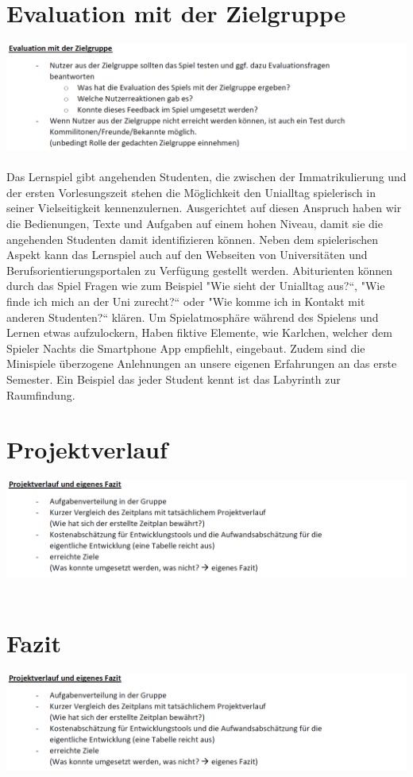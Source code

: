 \documentclass[a4paper, 11pt]{article} %
\begin{document}
\section{Evaluation mit der Zielgruppe}
\includegraphics[scale=0.5]{images/evaluation.png}\\\\
Das Lernspiel gibt angehenden Studenten, die zwischen der Immatrikulierung und der ersten Vorlesungszeit stehen die Möglichkeit den Unialltag spielerisch in seiner Vielseitigkeit kennenzulernen. Ausgerichtet auf diesen Anspruch haben wir die Bedienungen, Texte und Aufgaben auf einem hohen Niveau, damit sie die angehenden Studenten damit identifizieren können. Neben dem spielerischen Aspekt kann das Lernspiel auch auf den Webseiten von Universitäten und Berufsorientierungsportalen zu Verfügung gestellt werden. Abiturienten können durch das Spiel Fragen wie zum Beispiel "Wie sieht der Unialltag aus?“, "Wie finde ich mich an der Uni zurecht?“ oder "Wie komme ich in Kontakt mit anderen Studenten?“ klären. Um Spielatmosphäre während des Spielens und Lernen etwas aufzulockern, Haben fiktive Elemente, wie Karlchen, welcher dem Spieler Nachts die Smartphone App empfiehlt, eingebaut. Zudem sind die Minispiele überzogene Anlehnungen an unsere eigenen Erfahrungen an das erste Semester. Ein Beispiel das jeder Student kennt ist das Labyrinth zur Raumfindung. 
\section{Projektverlauf}
\includegraphics[scale=0.5]{images/projektverlauf.png}\\\\
\section{Fazit}
\includegraphics[scale=0.5]{images/projektverlauf.png}\\\\
\end{document}
